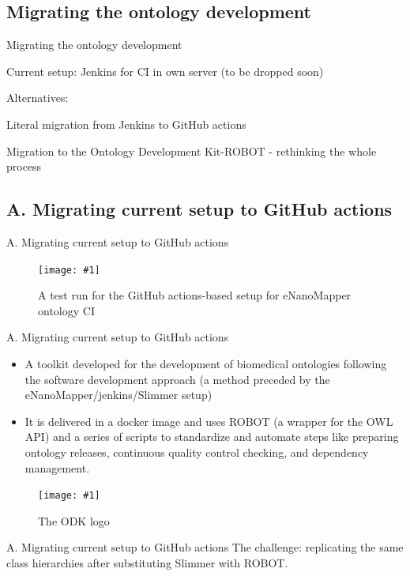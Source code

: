 \documentclass[english, xcolor=dvipsnames, aspectratio=169]{beamer}
\newcommand{\subitem}[1]{
    {\setlength\itemindent{15pt} \item[-] #1}
}
\newcommand{\includefiguremediumlarger}[2]
{
    \begin{figure}[h]
    \caption{#2}
    \centering
    \texttt{[image: \#1]}
    \end{figure}
}
\newcommand{\includefiguremedium}[2]
{
    \begin{figure}[h]
    \caption{#2}
    \centering
    \texttt{[image: \#1]}
    \end{figure}
}
\newcommand{\subsectiontitle}{}
\begin{document}
% 
\renewcommand{\subsectiontitle}{Migrating the ontology development}
\subsection{\subsectiontitle}
\begin{frame}{\subsectiontitle}
\begin{itemize}
    \item Current setup: Jenkins for CI in own server (to be dropped soon)
    \item Alternatives:
        \subitem{Literal migration from Jenkins to GitHub actions}
        \subitem{Migration to the Ontology Development Kit-ROBOT - rethinking the whole process}
\end{itemize}
\end{frame}



% 
\renewcommand{\subsectiontitle}{A. Migrating current setup to GitHub actions}
\subsection{\subsectiontitle}
\begin{frame}{\subsectiontitle}
\centering
\includefiguremediumlarger{ghactionsrun.pdf}{A test run for the GitHub actions-based setup for eNanoMapper ontology CI}
\end{frame}

% 
\begin{frame}{\subsectiontitle}
\begin{itemize}
    \item  A toolkit developed for the development of biomedical ontologies following the software development approach (a method preceded by the eNanoMapper/jenkins/Slimmer setup)
    \item It is delivered in a docker image and uses ROBOT (a wrapper for the OWL API) and a series of scripts to standardize and automate steps like preparing ontology releases, continuous quality control checking, and dependency management. \cite{odk_matentzoglu}
\end{itemize}

    \includefiguremedium{odk-logo_black-banner.png}{The ODK logo}
\end{frame}

\begin{frame}{\subsectiontitle}
The challenge: replicating the same class hierarchies after substituting Slimmer with ROBOT.
\end{frame}
\end{document}
